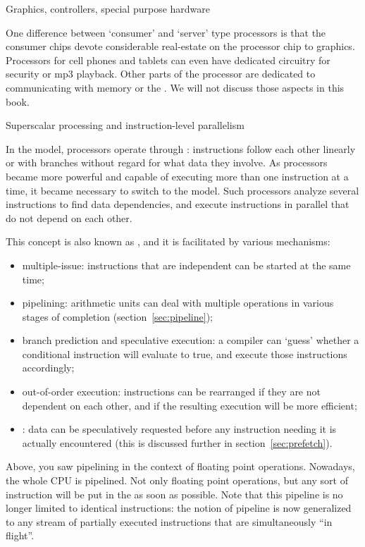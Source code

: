  {Graphics, controllers, special purpose hardware}

One difference between `consumer' and `server' type processors
is that the consumer chips devote considerable real-estate
on the processor chip to graphics. Processors for cell phones and tablets
can even have dedicated circuitry for security or mp3 playback.
Other parts of the processor
are dedicated to communicating with memory or the .
We will not discuss those aspects in this book.

 {Superscalar processing and instruction-level parallelism}
\label{sec:pipelinecpu}

In the  model,
processors operate through :
instructions follow each other linearly or with branches without regard for what
data they involve. As processors became more powerful and capable of executing
more than one instruction at a time, it became necessary to switch to the
 model. Such  processors
analyze several instructions to find data dependencies, and execute
instructions in parallel that do not depend on each other.

This concept is also known as , and it is facilitated by
various mechanisms:
\begin{itemize}
\item multiple-issue: instructions that are independent can be started
  at the same time;
\item pipelining: arithmetic units can deal with
  multiple operations in various stages of completion
  (section~\ref{sec:pipeline});
\item branch prediction and speculative execution: a compiler can
  `guess' whether a conditional instruction will evaluate to true, and
  execute those instructions accordingly;
\item out-of-order execution: instructions can be rearranged if they
  are not dependent on each other, and if the resulting execution will
  be more efficient;
\item {}: data can be speculatively requested before any
  instruction needing it is actually encountered (this is discussed
  further in section~\ref{sec:prefetch}).
\end{itemize}

Above, you saw pipelining in the context of floating point
operations. Nowadays, the whole \ac{CPU} is pipelined. Not only floating point
operations, but any sort of instruction will be put in the
 as soon
as possible. Note that this pipeline is no longer limited to identical
instructions: the notion of pipeline is now generalized to any stream
of partially executed instructions that are simultaneously ``in
flight''.

